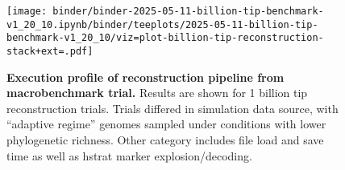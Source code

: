 \begin{figure}[h]
\centering
\texttt{[image: binder/binder-2025-05-11-billion-tip-benchmark-v1\_20\_10.ipynb/binder/teeplots/2025-05-11-billion-tip-benchmark-v1\_20\_10/viz=plot-billion-tip-reconstruction-stack+ext=.pdf]}
\vspace{-1em}
\caption{%
\textbf{Execution profile of reconstruction pipeline from macrobenchmark trial.}
\small
Results are shown for 1 billion tip reconstruction trials.
Trials differed in simulation data source, with ``adaptive regime'' genomes sampled under conditions with lower phylogenetic richness.
Other category includes file load and save time as well as hstrat marker explosion/decoding.
}
\label{fig:billion-tip-time}
\end{figure}
